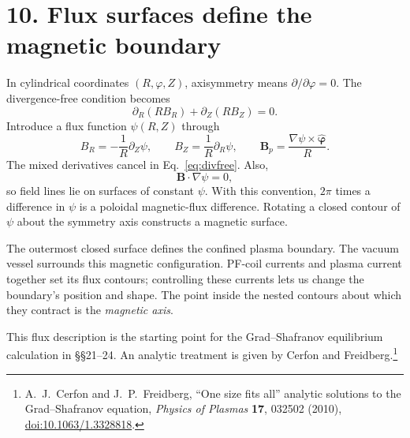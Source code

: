 \documentclass[11pt]{article}
\begin{document}
\section*{10. Flux surfaces define the magnetic boundary}
In cylindrical coordinates $(R,\varphi,Z)$, axisymmetry means
$\partial/\partial\varphi=0$. The divergence-free condition becomes
\begin{equation}
 \partial_R(RB_R)+\partial_Z(RB_Z)=0.
 \label{eq:divfree}
\end{equation}
Introduce a flux function $\psi(R,Z)$ through
\begin{equation}
 B_R=-\frac1R\partial_Z\psi,\qquad B_Z=\frac1R\partial_R\psi,\qquad
 \mathbf B_p=\frac{\nabla\psi\times\hat{\boldsymbol\varphi}}R.
 \label{eq:psidef}
\end{equation}
The mixed derivatives cancel in Eq.~\eqref{eq:divfree}. Also,
\begin{equation}
 \mathbf B\cdot\nabla\psi=0,
 \label{eq:psiconstant}
\end{equation}
so field lines lie on surfaces of constant $\psi$. With this convention, $2\pi$
times a difference in $\psi$ is a poloidal magnetic-flux difference. Rotating a closed
contour of $\psi$ about the symmetry axis constructs a magnetic surface.

The outermost closed surface defines the confined plasma boundary. The vacuum vessel
surrounds this magnetic configuration. PF-coil currents and plasma current together
set its flux contours; controlling these currents lets us change the boundary's
position and shape. The point inside the nested contours about which they contract
is the \emph{magnetic axis}.



This flux description is the starting point for the Grad--Shafranov equilibrium
calculation in §§21--24. An analytic treatment is given by Cerfon and
Freidberg.\footnote{A.~J.~Cerfon and J.~P.~Freidberg, ``One size fits all'' analytic
solutions to the Grad--Shafranov equation, \emph{Physics of Plasmas} \textbf{17},
032502 (2010), \href{https://doi.org/10.1063/1.3328818}{doi:10.1063/1.3328818}.}

\end{document}
